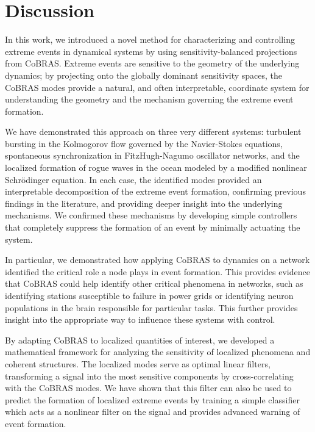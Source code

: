 \documentclass[twocolumn,10pt]{article}
\begin{document}
\section{Discussion}
\label{discussion}
In this work, we introduced a novel method for characterizing and controlling extreme events in dynamical systems by using sensitivity-balanced projections from CoBRAS. Extreme events are sensitive to the geometry of the underlying dynamics; by projecting onto the globally dominant sensitivity spaces, the CoBRAS modes provide a natural, and often interpretable, coordinate system for understanding the geometry and the mechanism governing the extreme event formation. 

We have demonstrated this approach on three very different systems: turbulent bursting in the Kolmogorov flow governed by the Navier-Stokes equations, spontaneous synchronization in FitzHugh-Nagumo oscillator networks, and the localized formation of rogue waves in the ocean modeled by a modified nonlinear Schr{\"o}dinger equation. In each case, the identified modes provided an interpretable decomposition of the extreme event formation, confirming previous findings in the literature, and providing deeper insight into the underlying mechanisms. 
%
We confirmed these mechanisms by developing simple controllers that completely suppress the formation of an event by minimally actuating the system. 


In particular, we demonstrated how applying CoBRAS to dynamics on a network identified the critical role a node plays in event formation. 
%
This provides evidence that CoBRAS could help identify other critical phenomena in networks, such as identifying stations susceptible to failure in power grids or identifying neuron populations in the brain responsible for particular tasks.  This further provides insight into the appropriate way to influence these systems with control. 


By adapting CoBRAS to localized quantities of interest, we developed a mathematical framework for analyzing the sensitivity of localized phenomena and coherent structures. 
%
The localized modes serve as optimal linear filters, transforming a signal into the most sensitive components by cross-correlating with the CoBRAS modes. 
%
We have shown that this filter can also be used to predict the formation of localized extreme events by training a simple classifier which acts as a nonlinear filter on the signal and provides advanced warning of event formation. 
\end{document}
